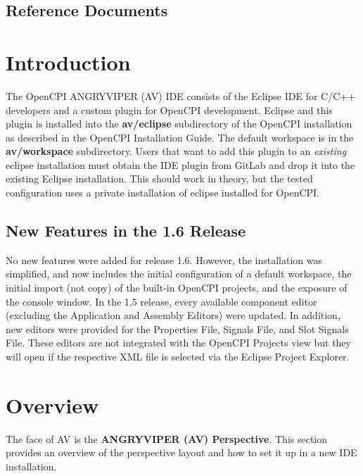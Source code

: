 \documentclass[10pt, a4paper, oneside]{article}
\begin{document}
\subsection{Reference Documents}
\def\myreferences{
\hline
OpenCPI Website &
\href{https://www.opencpi.org}{www.opencpi.org} \\
\hline
OpenCPI Component Development Guide &
\githubio{OpenCPI\_Component\_Development\_Guide.pdf} \\
\hline
OpenCPI Application Development Guide &
\githubio{OpenCPI\_Application\_Development\_Guide.pdf} \\
}

\section{Introduction}
The OpenCPI ANGRYVIPER (AV) {IDE} consists of the Eclipse IDE for C/C++ developers and a custom plugin for OpenCPI development. Eclipse and this plugin is installed into the \textbf{av/eclipse} subdirectory of the OpenCPI installation as described in the OpenCPI Installation Guide.  The default workspace is in the \textbf{av/workspace} subdirectory.  Users that want to add this plugin to an \textit{existing} eclipse installation must obtain the IDE plugin from GitLab and drop it into the existing Eclipse installation.  This should work in theory, but the tested configuration uses a private installation of eclipse installed for OpenCPI.
\subsection{New Features in the 1.6 Release}
No new features were added for release 1.6. However, the installation was simplified, and now includes the initial configuration of a default workspace, the initial import (not copy) of the built-in OpenCPI projects, and the exposure of the console window.
In the 1.5 release, every available component editor (excluding the Application and Assembly Editors) were updated. In addition, new editors were provided for the Properties File, Signals File, and Slot Signals File. These editors are not integrated with the OpenCPI Projects view but they will open if the respective XML file is selected via the Eclipse Project Explorer.

\newpage
\section{Overview}
The face of AV is the \textbf{ANGRYVIPER (AV) Perspective}. This section provides an overview of the perspective layout and how to set it up in a new IDE installation.
\end{document}
